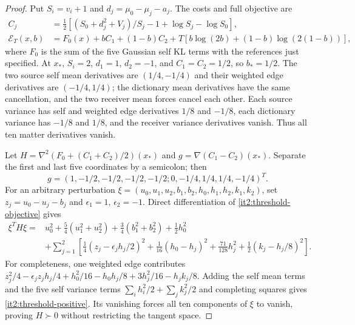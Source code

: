 \begin{proof}
Put $S_i=v_i+1$ and $d_j=\mu_0-\mu_j-a_j$. The costs and full objective are
\begin{equation}
 \begin{aligned}
 C_j&=\tfrac12[(S_0+d_j^2+V_j)/S_j-1+\log S_j-\log S_0],\\
 \mathcal E_T(x,b)&=F_0(x)+bC_1+(1-b)C_2
          +T[b\log(2b)+(1-b)\log(2(1-b))],
 \end{aligned}
 \label{it2:threshold-objective}
\end{equation}
where $F_0$ is the sum of the five Gaussian self KL terms with the references just specified. At $x_*$, $S_i=2$, $d_1=1$, $d_2=-1$, and $C_1=C_2=1/2$, so $b_*=1/2$. The two source self mean derivatives are $(1/4,-1/4)$ and their weighted edge derivatives are $(-1/4,1/4)$; the dictionary mean derivatives have the same cancellation, and the two receiver mean forces cancel each other. Each source variance has self and weighted edge derivatives $1/8$ and $-1/8$, each dictionary variance has $-1/8$ and $1/8$, and the receiver variance derivatives vanish. Thus all ten matter derivatives vanish.

Let $H=\nabla^2(F_0+(C_1+C_2)/2)(x_*)$ and $g=\nabla(C_1-C_2)(x_*)$. Separate the first and last five coordinates by a semicolon; then
\begin{equation}
 g=(1,-1/2,-1/2,-1/2,-1/2;0,-1/4,1/4,1/4,-1/4)^T .
 \label{it2:threshold-g}
\end{equation}
For an arbitrary perturbation $\xi=(u_0,u_1,u_2,b_1,b_2,h_0,h_1,h_2,k_1,k_2)$, set $z_j=u_0-u_j-b_j$ and $\epsilon_1=1$, $\epsilon_2=-1$. Direct differentiation of \cref{it2:threshold-objective} gives
\begin{equation}
 \begin{aligned}
 \xi^TH\xi={}&u_0^2+\tfrac54(u_1^2+u_2^2)
      +\tfrac34(b_1^2+b_2^2)+\tfrac12h_0^2\\
 &+\sum_{j=1}^2\left[
   \tfrac14(z_j-\epsilon_jh_j/2)^2+\tfrac1{16}(h_0-h_j)^2
   +\tfrac{71}{128}h_j^2+\tfrac12(k_j-h_j/8)^2\right].
 \end{aligned}
 \label{it2:threshold-positive}
\end{equation}
For completeness, one weighted edge contributes $z_j^2/4-\epsilon_jz_jh_j/4+h_0^2/16-h_0h_j/8+3h_j^2/16-h_jk_j/8$. Adding the self mean terms and the five self variance terms $\sum_i h_i^2/2+\sum_j k_j^2/2$ and completing squares gives \cref{it2:threshold-positive}. Its vanishing forces all ten components of $\xi$ to vanish, proving $H\succ0$ without restricting the tangent space.


\end{proof}
